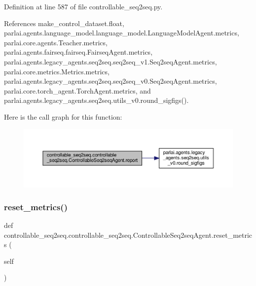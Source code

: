 Definition at line 587 of file controllable\+\_\+seq2seq.\+py.



References make\+\_\+control\+\_\+dataset.\+float, parlai.\+agents.\+language\+\_\+model.\+language\+\_\+model.\+Language\+Model\+Agent.\+metrics, parlai.\+core.\+agents.\+Teacher.\+metrics, parlai.\+agents.\+fairseq.\+fairseq.\+Fairseq\+Agent.\+metrics, parlai.\+agents.\+legacy\+\_\+agents.\+seq2seq.\+seq2seq\+\_\+v1.\+Seq2seq\+Agent.\+metrics, parlai.\+core.\+metrics.\+Metrics.\+metrics, parlai.\+agents.\+legacy\+\_\+agents.\+seq2seq.\+seq2seq\+\_\+v0.\+Seq2seq\+Agent.\+metrics, parlai.\+core.\+torch\+\_\+agent.\+Torch\+Agent.\+metrics, and parlai.\+agents.\+legacy\+\_\+agents.\+seq2seq.\+utils\+\_\+v0.\+round\+\_\+sigfigs().

Here is the call graph for this function\+:
\nopagebreak
\begin{figure}[H]
\begin{center}
\leavevmode
\includegraphics[width=350pt]{classcontrollable__seq2seq_1_1controllable__seq2seq_1_1ControllableSeq2seqAgent_a0e4d244d148a011ab541b204518e227a_cgraph}
\end{center}
\end{figure}
\mbox{\label{classcontrollable__seq2seq_1_1controllable__seq2seq_1_1ControllableSeq2seqAgent_aca4a0f3e0d8da6f75070febb92498e8c}} 
\subsubsection{\texorpdfstring{reset\+\_\+metrics()}{reset\_metrics()}}
{\footnotesize\ttfamily def controllable\+\_\+seq2seq.\+controllable\+\_\+seq2seq.\+Controllable\+Seq2seq\+Agent.\+reset\+\_\+metrics (\begin{DoxyParamCaption}\item[{}]{self }\end{DoxyParamCaption})}

